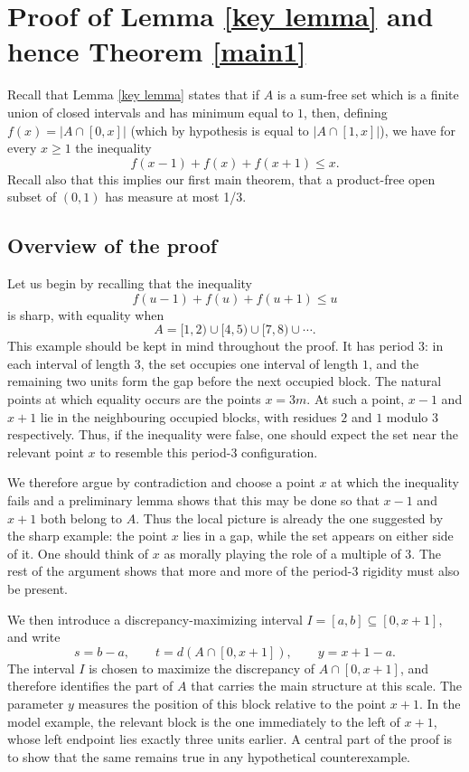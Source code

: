 \documentclass[11pt,reqno]{amsart}
\theoremstyle{definition}
\def\F#1{f(#1)}
\begin{document}
\section{Proof of Lemma \ref{key lemma} and hence Theorem \ref{main1}}

Recall that Lemma \ref{key lemma} states that if $A$ is a sum-free set which is a finite union of closed intervals and has minimum equal to $1$, then, defining $\F{x} = |A\cap [0,x]|$ (which by hypothesis is equal to $|A\cap [1,x]|$), we have for every $x\geq 1$ the inequality
\begin{equation*}
\F{x-1}+\F{x}+\F{x+1}\leq x .
\end{equation*}
Recall also that this implies our first main theorem, that a product-free open subset of $(0,1)$ has measure at most 1/3. 

\subsection{Overview of the proof}
Let us begin by recalling that the inequality
$$
\F{u-1}+\F{u}+\F{u+1}\leq u
$$
is sharp, with equality when
$$
A=[1,2)\cup[4,5)\cup[7,8)\cup\cdots.
$$
This example should be kept in mind throughout the proof. It has period $3$: in each interval of length $3$, the set occupies one interval of length $1$, and the remaining two units form the gap before the next occupied block. The natural points at which equality occurs are the points $x=3m$. At such a point, $x-1$ and $x+1$ lie in the neighbouring occupied blocks, with residues $2$ and $1$ modulo $3$ respectively. Thus, if the inequality were false, one should expect the set near the relevant point $x$ to resemble this period-3 configuration.

We therefore argue by contradiction and choose a point $x$ at which the inequality fails and a preliminary lemma shows that this may be done so that $x-1$ and $x+1$ both belong to $A$. Thus the local picture is already the one suggested by the sharp example: the point $x$ lies in a gap, while the set appears on either side of it. One should think of $x$ as morally playing the role of a multiple of $3$. The rest of the argument shows that more and more of the period-3 rigidity must also be present.

We then introduce a discrepancy-maximizing interval $I=[a,b]\subseteq[0,x+1]$,
and write
$$
s=b-a,\qquad t=d(A\cap[0,x+1]),\qquad y=x+1-a.
$$
The interval $I$ is chosen to maximize the discrepancy of $A\cap[0,x+1]$, and therefore identifies the part of $A$ that carries the main structure at this scale. The parameter $y$ measures the position of this block relative to the point $x+1$. In the model example, the relevant block is the one immediately to the left of $x+1$, whose left endpoint lies exactly three units earlier. A central part of the proof is to show that the same remains true in any hypothetical counterexample.
\end{document}
